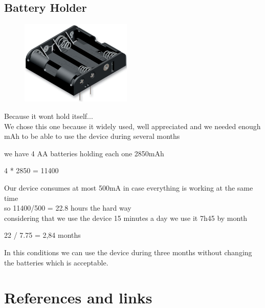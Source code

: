 \documentclass[12pt,a4paper,landscape]{article}
\begin{document}
\begin{multicols}{2}
			\vspace{4cm}
	\subsection*{Battery Holder}
			\begin{figure}[H]
			\centering
			\includegraphics[height=4cm]{images/battery_holder.png} 
			\end{figure}
			Because it wont hold itself...\\
			We chose this one because it widely used, well appreciated and we needed enough mAh to be able to use the device during several months 

			we have 4 AA batteries holding each one 2850mAh 

			4 * 2850 = 11400 

			Our device consumes at most 500mA in case everything is working at the same time\\

			so 11400/500 = 22.8 hours the hard way\\

			considering that we use the device 15 minutes a day we use it 7h45 by month 

			 22 / 7.75 = 2,84 months 

			In this conditions we can use the device during three months without changing the batteries which is acceptable.
	\end{multicols}

	\vspace{3cm}

\newpage
{}
\section*{References and links}

	\vspace{5em}
\end{document}

